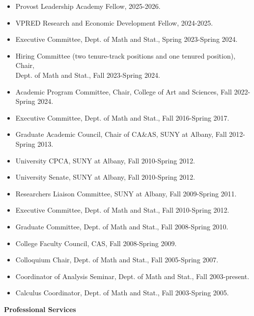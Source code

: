 \documentclass[12pt]{res} %
\begin{document}
\begin{resume}
\begin{itemize} \itemsep -2pt  %
\item{Provost Leadership Academy Fellow}, 2025-2026.
\item{VPRED Research and Economic Development Fellow}, 2024-2025.
\item {Executive Committee}, Dept. of Math and Stat., Spring 2023-Spring 2024.
\item {Hiring Committee (two tenure-track positions and one tenured position)}, Chair, \\Dept. of Math and Stat., Fall 2023-Spring 2024.
\item {Academic Program Committee}, Chair, College of Art and Sciences, Fall 2022-Spring 2024.
\item {Executive Committee}, Dept. of Math and Stat., Fall 2016-Spring 2017.
\item {Graduate Academic Council, Chair of CA\&AS}, SUNY at Albany, Fall 2012-Spring 2013.
\item {University CPCA}, SUNY at Albany, Fall 2010-Spring 2012.
\item {University Senate}, SUNY at Albany, Fall 2010-Spring 2012.
\item {Researchers Liaison Committee}, SUNY at Albany, Fall 2009-Spring 2011.
\item {Executive Committee}, Dept. of Math and Stat., Fall 2010-Spring 2012.
\item {Graduate Committee}, Dept. of Math and Stat., Fall 2008-Spring 2010.
\item {College Faculty Council}, CAS, Fall 2008-Spring 2009.
\item {Colloquium Chair}, Dept. of Math and Stat., Fall 2005-Spring 2007.
\item {Coordinator of Analysis Seminar}, Dept. of Math and Stat., Fall 2003-present.
\item {Calculus Coordinator}, Dept. of Math and Stat., Fall 2003-Spring 2005.
\end{itemize}

\textbf{Professional Services}

   \begin{itemize} \itemsep -2pt  %
   

\end{itemize}
\end{resume}
\end{document}
